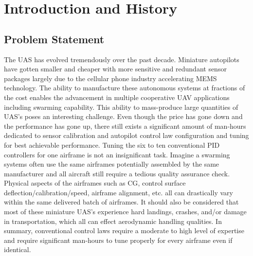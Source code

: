 \chapter{Introduction and History}\label{ch:intro}


\section{Problem Statement}
The \ac{UAS} has evolved tremendously over the past decade.  Miniature autopilots have gotten smaller and cheaper with more sensitive and redundant sensor packages largely due to the cellular phone industry accelerating \ac{MEMS} technology.  The ability to manufacture these autonomous systems at fractions of the cost enables the advancement in multiple cooperative UAV applications including swarming capability.  This ability to mass-produce large quantities of \ac{UAS}'s poses an interesting challenge.  Even though the price has gone down and the performance has gone up, there still exists a significant amount of man-hours dedicated to sensor calibration and autopilot control law configuration and tuning for best achievable performance.  Tuning the six to ten conventional \ac{PID} controllers for one airframe is not an insignificant task.  Imagine a swarming systems often use the same airframes potentially assembled by the same manufacturer and all aircraft still require a tedious quality assurance check.  Physical aspects of the airframes such as \ac{CG}, control surface deflection/calibration/speed, airframe alignment, etc. all can drastically vary within the same delivered batch of airframes.  It should also be considered that most of these miniature \ac{UAS}'s experience hard landings, crashes, and/or damage in transportation, which all can effect aerodynamic handling qualities.  In summary, conventional control laws require a moderate to high level of expertise and require significant man-hours to tune properly for every airframe even if identical.  


